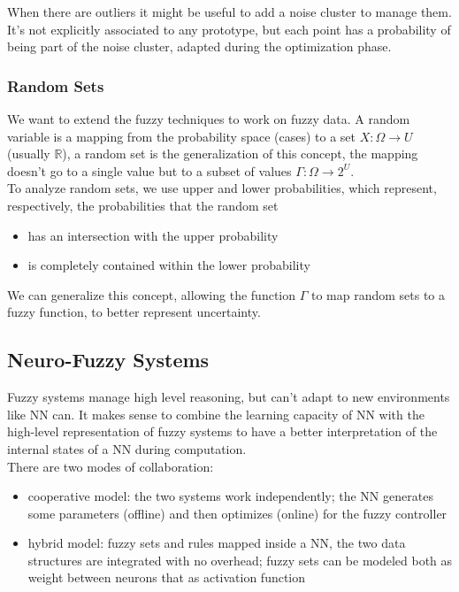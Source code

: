 When there are outliers it might be useful to add a noise cluster to manage them. It's not explicitly associated to any prototype, but each point has a probability of being part of the noise cluster, adapted during the optimization phase.\\

\subsubsection{Random Sets}
We want to extend the fuzzy techniques to work on fuzzy data. A random variable is a mapping from the probability space (cases) to a set $X: \Omega \rightarrow U$ (usually $\mathbb{R}$), a random set is the generalization of this concept, the mapping doesn't go to a single value but to a subset of values $\Gamma: \Omega \rightarrow 2^U$. \\

To analyze random sets, we use upper and lower probabilities, which represent, respectively, the probabilities that the random set
\begin{itemize}
	\item has an intersection with the upper probability
	\item is completely contained within the lower probability
\end{itemize}

We can generalize this concept, allowing the function $\Gamma$ to map random sets to a fuzzy function, to better represent uncertainty.\\

\subsection{Neuro-Fuzzy Systems}

Fuzzy systems manage high level reasoning, but can't adapt to new environments like NN can. It makes sense to combine the learning capacity of NN with the high-level representation of fuzzy systems to have a better interpretation of the internal states of a NN during computation.\\

There are two modes of collaboration: 
\begin{itemize}
	\item cooperative model: the two systems work independently; the NN generates some parameters (offline) and then optimizes (online) for the fuzzy controller
	\item hybrid model: fuzzy sets and rules mapped inside a NN, the two data structures are integrated with no overhead; fuzzy sets can be modeled both as weight between neurons that as activation function
\end{itemize}





